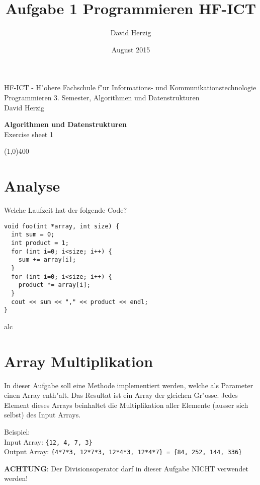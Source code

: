 \documentclass[a4paper,10pt]{article}
\title{Aufgabe 1 Programmieren HF-ICT}
\author{David Herzig}
\date{August 2015}
\begin{document}
HF-ICT - H"ohere Fachschule f"ur Informations- und Kommunikationstechnologie\\
Programmieren 3. Semester, Algorithmen und Datenstrukturen\\
David Herzig

\vspace{2mm}

\begin{center}
{\Large \bf Algorithmen und Datenstrukturen}\\
Exercise sheet 1
\end{center}

\vspace{2mm}

\line(1,0){400}

\vspace{5mm}

\section{Analyse}
Welche Laufzeit hat der folgende Code?

\begin{lstlisting}
void foo(int *array, int size) {
  int sum = 0;
  int product = 1;
  for (int i=0; i<size; i++) {
    sum += array[i];
  }
  for (int i=0; i<size; i++) {
    product *= array[i];
  }
  cout << sum << "," << product << endl;
}
\end{lstlisting}

alc
\section{Array Multiplikation}
In dieser Aufgabe soll eine Methode implementiert werden, welche als Parameter einen Array enth"alt.
Das Resultat ist ein Array der gleichen Gr"osse. Jedes Element dieses Arrays beinhaltet die
Multiplikation aller Elemente (ausser sich selbst) des Input Arrays.

\vspace{3mm}

Beispiel:\\
Input Array: \verb|{12, 4, 7, 3}|\\
Output Array: \verb|{4*7*3, 12*7*3, 12*4*3, 12*4*7} = {84, 252, 144, 336}|

\vspace{3mm}

{\bf ACHTUNG}: Der Divisionsoperator darf in dieser Aufgabe NICHT verwendet werden!

\vspace{3mm}
\end{document}
